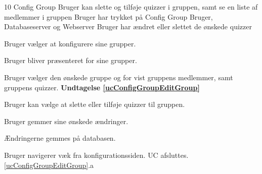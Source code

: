 \uchead
	{10} %
	{Config Group} %
	{Bruger kan slette og tilføje quizzer i gruppen, samt se en liste af medlemmer i gruppen} %
	{Bruger har trykket på Config Group} %
	{Bruger, Databaseserver og Webserver} %
	{} %
	{} %
	{} %
	{Bruger har ændret eller slettet de ønskede quizzer} %


\item Bruger vælger at konfigurere sine grupper.

\item Bruger bliver præsenteret for sine grupper.

\item\label{ucConfigGroupEditGroup} Bruger vælger den ønskede gruppe og for vist gruppens medlemmer, samt gruppens quizzer. \textbf{Undtagelse \ref{ucConfigGroupEditGroup}}

\item Bruger kan vælge at slette eller tilføje quizzer til gruppen.

\item Bruger gemmer sine ønskede ændringer.

\item Ændringerne gemmes på databasen.


\ucdescriptionend %

\ucextension
	{Bruger navigerer væk fra konfigurationssiden.}
	{UC afsluttes.}
	{\ref{ucConfigGroupEditGroup}.a}

